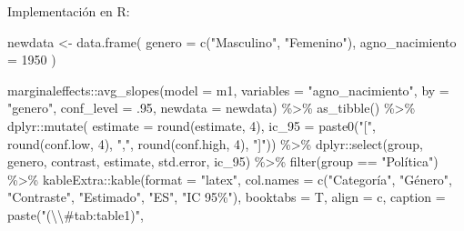 \documentclass[
  12pt,
  a4paper,
]{article}
\newenvironment{Shaded}{\begin{snugshade}}{\end{snugshade}}
\newcommand{\AttributeTok}[1]{\textcolor[rgb]{0.77,0.63,0.00}{#1}}
\newcommand{\DecValTok}[1]{\textcolor[rgb]{0.00,0.00,0.81}{#1}}
\newcommand{\FunctionTok}[1]{\textcolor[rgb]{0.00,0.00,0.00}{#1}}
\newcommand{\NormalTok}[1]{#1}
\newcommand{\OtherTok}[1]{\textcolor[rgb]{0.56,0.35,0.01}{#1}}
\newcommand{\SpecialCharTok}[1]{\textcolor[rgb]{0.00,0.00,0.00}{#1}}
\newcommand{\StringTok}[1]{\textcolor[rgb]{0.31,0.60,0.02}{#1}}
\begin{document}
Implementación en R:

\begin{Shaded}
\begin{Highlighting}[]
\NormalTok{newdata }\OtherTok{\textless{}{-}} \FunctionTok{data.frame}\NormalTok{(}
  \AttributeTok{genero =} \FunctionTok{c}\NormalTok{(}\StringTok{"Masculino"}\NormalTok{, }\StringTok{"Femenino"}\NormalTok{),}
  \AttributeTok{agno\_nacimiento =} \DecValTok{1950}
\NormalTok{)}

\NormalTok{marginaleffects}\SpecialCharTok{::}\FunctionTok{avg\_slopes}\NormalTok{(}\AttributeTok{model =}\NormalTok{ m1, }
                            \AttributeTok{variables =} \StringTok{"agno\_nacimiento"}\NormalTok{,}
                            \AttributeTok{by =} \StringTok{"genero"}\NormalTok{,}
                            \AttributeTok{conf\_level =}\NormalTok{ .}\DecValTok{95}\NormalTok{,}
                            \AttributeTok{newdata =}\NormalTok{ newdata) }\SpecialCharTok{\%\textgreater{}\%} 
  \FunctionTok{as\_tibble}\NormalTok{() }\SpecialCharTok{\%\textgreater{}\%} 
\NormalTok{  dplyr}\SpecialCharTok{::}\FunctionTok{mutate}\NormalTok{(}
    \AttributeTok{estimate =} \FunctionTok{round}\NormalTok{(estimate, }\DecValTok{4}\NormalTok{),}
    \AttributeTok{ic\_95 =} \FunctionTok{paste0}\NormalTok{(}\StringTok{"["}\NormalTok{, }\FunctionTok{round}\NormalTok{(conf.low, }\DecValTok{4}\NormalTok{), }\StringTok{","}\NormalTok{, }
                   \FunctionTok{round}\NormalTok{(conf.high, }\DecValTok{4}\NormalTok{), }\StringTok{"]"}\NormalTok{)) }\SpecialCharTok{\%\textgreater{}\%} 
\NormalTok{  dplyr}\SpecialCharTok{::}\FunctionTok{select}\NormalTok{(group, genero, contrast, estimate, std.error, ic\_95) }\SpecialCharTok{\%\textgreater{}\%}
  \FunctionTok{filter}\NormalTok{(group }\SpecialCharTok{==} \StringTok{"Política"}\NormalTok{) }\SpecialCharTok{\%\textgreater{}\%} 
\NormalTok{  kableExtra}\SpecialCharTok{::}\FunctionTok{kable}\NormalTok{(}\AttributeTok{format =} \StringTok{"latex"}\NormalTok{, }
                    \AttributeTok{col.names =} \FunctionTok{c}\NormalTok{(}\StringTok{"Categoría"}\NormalTok{, }\StringTok{"Género"}\NormalTok{, }\StringTok{"Contraste"}\NormalTok{, }
                                  \StringTok{"Estimado"}\NormalTok{, }\StringTok{"ES"}\NormalTok{, }\StringTok{"IC 95\%"}\NormalTok{),}
                    \AttributeTok{booktabs =}\NormalTok{ T, }
                    \AttributeTok{align =} \StringTok{\textquotesingle{}c\textquotesingle{}}\NormalTok{,}
                    \AttributeTok{caption =} \FunctionTok{paste}\NormalTok{(}\StringTok{"(}\SpecialCharTok{\textbackslash{}\textbackslash{}}\StringTok{\#tab:table1)"}\NormalTok{,}

\end{Highlighting}
\end{Shaded}
\end{document}
